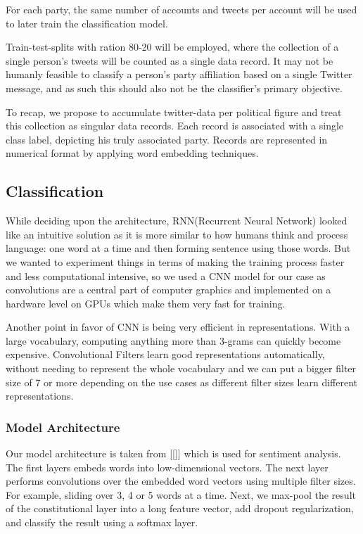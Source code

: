 \documentclass[10pt, oneside]{article}
\begin{document}
\begin{multicols}{2}
For each party, the same number of accounts and tweets per account will be used to later train the classification model.

Train-test-splits with ration 80-20 will be employed, where the collection of a single person's tweets will be counted as a single data record. It may not be humanly feasible to classify a person's party affiliation based on a single Twitter message, and as such this should also not be the classifier's primary objective.

To recap, we propose to accumulate twitter-data per political figure and treat this collection as singular data records. Each record is associated with a single class label, depicting his truly associated party. Records are represented in numerical format by applying word embedding techniques. 

\subsection{Classification}

While deciding upon the architecture, RNN(Recurrent Neural Network) looked like an intuitive solution as it is more similar to how humans think and process language: one word at a time and then forming sentence using those words. But we wanted to experiment things in terms of making the training process faster and less computational intensive, so we used a CNN model for our case as convolutions are a central part of computer graphics and implemented on a hardware level on GPUs which make them very fast for training.

Another point in favor of CNN is being very efficient in representations.  With a large vocabulary, computing anything more than 3-grams can quickly become expensive.  Convolutional Filters learn good representations automatically, without needing to represent the whole vocabulary and we can put a bigger filter size of 7 or more depending on the use cases as different filter sizes learn different representations. 

\subsubsection{Model Architecture}

Our model architecture is taken from [[]] which is used for sentiment analysis. The first layers embeds words into low-dimensional vectors. The next layer performs convolutions over the embedded word vectors using multiple filter sizes. For example, sliding over 3, 4 or 5 words at a time. Next, we max-pool the result of the constitutional layer into a long feature vector, add dropout regularization, and classify the result using a softmax layer.



\end{multicols}
\end{document}
